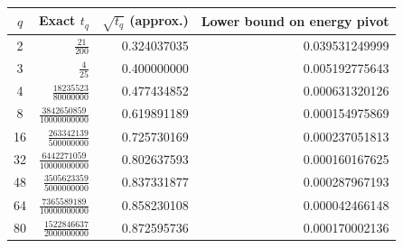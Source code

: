 \begin{tabular}{@{}crrr@{}}
\toprule
$q$ & Exact $t_q$ & $\sqrt{t_q}$ (approx.) & Lower bound on energy pivot\\
\midrule
2 & $\frac{21}{200}$ & 0.324037035 & 0.039531249999 \\
3 & $\frac{4}{25}$ & 0.400000000 & 0.005192775643 \\
4 & $\frac{18235523}{80000000}$ & 0.477434852 & 0.000631320126 \\
8 & $\frac{3842650859}{10000000000}$ & 0.619891189 & 0.000154975869 \\
16 & $\frac{263342139}{500000000}$ & 0.725730169 & 0.000237051813 \\
32 & $\frac{6442271059}{10000000000}$ & 0.802637593 & 0.000160167625 \\
48 & $\frac{3505623359}{5000000000}$ & 0.837331877 & 0.000287967193 \\
64 & $\frac{7365589189}{10000000000}$ & 0.858230108 & 0.000042466148 \\
80 & $\frac{1522846637}{2000000000}$ & 0.872595736 & 0.000170002136 \\
\bottomrule
\end{tabular}
